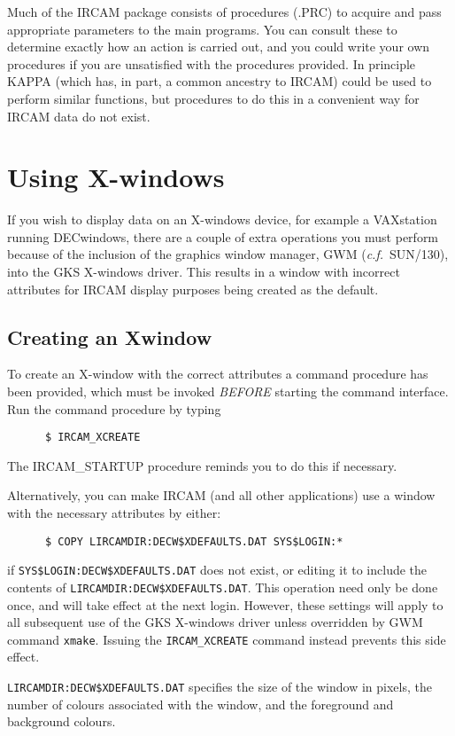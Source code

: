 Much of the IRCAM package consists of procedures (.PRC) to acquire and
pass appropriate parameters to the main programs.  You can consult
these to determine exactly how an action is carried out, and you could
write your own procedures if you are unsatisfied with the procedures
provided. In principle KAPPA (which has, in part, a common ancestry to
IRCAM) could be used to perform similar functions, but procedures to do
this in a convenient way for IRCAM data do not exist. 

\section {Using X-windows}

If you wish to display data on an X-windows device, for example a
VAXstation running DECwindows, there are a couple of extra operations you
must perform because of the inclusion of the graphics window manager,
GWM ({\it c.f.}\ SUN/130), into the GKS X-windows driver. This results in a
window with incorrect attributes for IRCAM display purposes being created as
the default.

\subsection{Creating an Xwindow}

To create an X-window with the correct attributes a command procedure has been
provided, which must be invoked {\em BEFORE\/} starting the command interface.
Run the command procedure by typing
\begin{verbatim}
      $ IRCAM_XCREATE
\end{verbatim}
The IRCAM\_STARTUP procedure reminds you to do this if necessary.

Alternatively, you can make IRCAM (and all other applications) use a window 
with the necessary attributes by either: 
\begin{verbatim}
      $ COPY LIRCAMDIR:DECW$XDEFAULTS.DAT SYS$LOGIN:*
\end{verbatim}
if {\tt SYS\$LOGIN:DECW\$XDEFAULTS.DAT} does not exist, or editing it to 
include the contents of {\tt LIRCAMDIR:DECW\$XDEFAULTS.DAT}.
This operation need only be done once, and will take effect at the next login.
However, these settings will apply to all subsequent use of the GKS
X-windows driver unless overridden by GWM command {\tt xmake}. Issuing the
{\tt IRCAM\_XCREATE} command instead prevents this side effect.

{\tt LIRCAMDIR:DECW\$XDEFAULTS.DAT}
specifies the size of the window in pixels, the number of colours
associated with the window, and the foreground and background colours.

